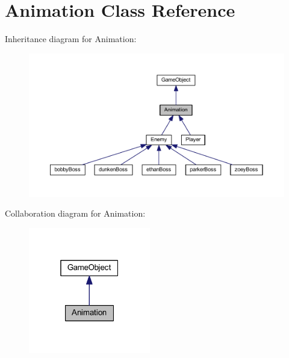 \hypertarget{class_animation}{\section{Animation Class Reference}
\label{class_animation}
}


Inheritance diagram for Animation\+:\nopagebreak
\begin{figure}[H]
\begin{center}
\leavevmode
\includegraphics[width=350pt]{class_animation__inherit__graph}
\end{center}
\end{figure}


Collaboration diagram for Animation\+:\nopagebreak
\begin{figure}[H]
\begin{center}
\leavevmode
\includegraphics[width=151pt]{class_animation__coll__graph}
\end{center}
\end{figure}
